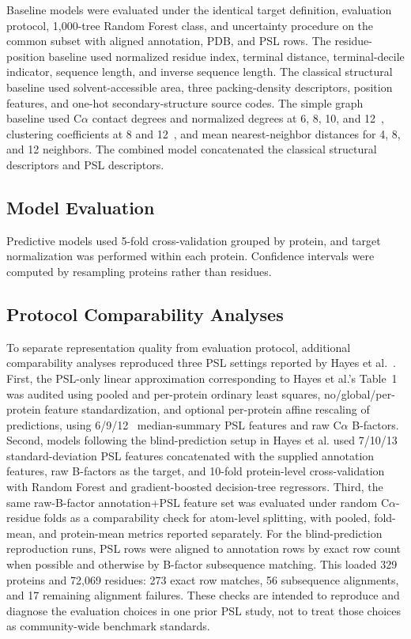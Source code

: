 \documentclass[11pt]{article}
\newcommand{\angstrom}{\text{\normalfont\AA}\xspace}
\newcommand{\calpha}{C\ensuremath{\alpha}\xspace}
\begin{document}
Baseline models were evaluated under the identical target definition, evaluation protocol, 1,000-tree Random Forest class, and uncertainty procedure on the common subset with aligned annotation, PDB, and PSL rows. The residue-position baseline used normalized residue index, terminal distance, terminal-decile indicator, sequence length, and inverse sequence length. The classical structural baseline used solvent-accessible area, three packing-density descriptors, position features, and one-hot secondary-structure source codes. The simple graph baseline used \calpha contact degrees and normalized degrees at 6, 8, 10, and 12~\angstrom, clustering coefficients at 8 and 12~\angstrom, and mean nearest-neighbor distances for 4, 8, and 12 neighbors. The combined model concatenated the classical structural descriptors and PSL descriptors.

\subsection{Model Evaluation}
Predictive models used 5-fold cross-validation grouped by protein, and target normalization was performed within each protein. Confidence intervals were computed by resampling proteins rather than residues.

\subsection{Protocol Comparability Analyses}
To separate representation quality from evaluation protocol, additional comparability analyses reproduced three PSL settings reported by Hayes et al.~\citep{hayes2025, hayes2025correction}. First, the PSL-only linear approximation corresponding to Hayes et al.'s Table~1 was audited using pooled and per-protein ordinary least squares, no/global/per-protein feature standardization, and optional per-protein affine rescaling of predictions, using 6/9/12~\angstrom median-summary PSL features and raw \calpha B-factors. Second, models following the blind-prediction setup in Hayes et al. used 7/10/13~\angstrom standard-deviation PSL features concatenated with the supplied annotation features, raw B-factors as the target, and 10-fold protein-level cross-validation with Random Forest and gradient-boosted decision-tree regressors. Third, the same raw-B-factor annotation+PSL feature set was evaluated under random \calpha-residue folds as a comparability check for atom-level splitting, with pooled, fold-mean, and protein-mean metrics reported separately. For the blind-prediction reproduction runs, PSL rows were aligned to annotation rows by exact row count when possible and otherwise by B-factor subsequence matching. This loaded 329 proteins and 72,069 residues: 273 exact row matches, 56 subsequence alignments, and 17 remaining alignment failures. These checks are intended to reproduce and diagnose the evaluation choices in one prior PSL study, not to treat those choices as community-wide benchmark standards.
\end{document}
